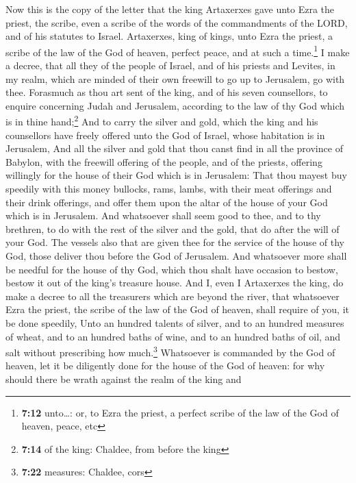  Now this is the copy of the letter that the king
Artaxerxes gave unto Ezra the priest, the scribe, even a scribe of the
words of the commandments of the LORD, and of his statutes to Israel.
 Artaxerxes, king of kings, unto Ezra the priest, a
scribe of the law of the God of heaven, perfect peace, and at such a
time.\footnote{\textbf{7:12} unto\ldots: or, to Ezra the priest, a
  perfect scribe of the law of the God of heaven, peace, etc}
 I make a decree, that all they of the people of Israel,
and of his priests and Levites, in my realm, which are minded of their
own freewill to go up to Jerusalem, go with thee. 
Forasmuch as thou art sent of the king, and of his seven counsellors, to
enquire concerning Judah and Jerusalem, according to the law of thy God
which is in thine hand;\footnote{\textbf{7:14} of the king: Chaldee,
  from before the king}  And to carry the silver and
gold, which the king and his counsellors have freely offered unto the
God of Israel, whose habitation is in Jerusalem,  And all
the silver and gold that thou canst find in all the province of Babylon,
with the freewill offering of the people, and of the priests, offering
willingly for the house of their God which is in Jerusalem:
 That thou mayest buy speedily with this money bullocks,
rams, lambs, with their meat offerings and their drink offerings, and
offer them upon the altar of the house of your God which is in
Jerusalem.  And whatsoever shall seem good to thee, and
to thy brethren, to do with the rest of the silver and the gold, that do
after the will of your God.  The vessels also that are
given thee for the service of the house of thy God, those deliver thou
before the God of Jerusalem.  And whatsoever more shall
be needful for the house of thy God, which thou shalt have occasion to
bestow, bestow it out of the king's treasure house.  And
I, even I Artaxerxes the king, do make a decree to all the treasurers
which are beyond the river, that whatsoever Ezra the priest, the scribe
of the law of the God of heaven, shall require of you, it be done
speedily,  Unto an hundred talents of silver, and to an
hundred measures of wheat, and to an hundred baths of wine, and to an
hundred baths of oil, and salt without prescribing how much.\footnote{\textbf{7:22}
  measures: Chaldee, cors}  Whatsoever is commanded by
the God of heaven, let it be diligently done for the house of the God of
heaven: for why should there be wrath against the realm of the king and
